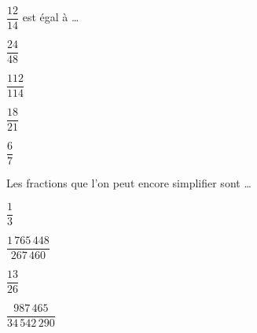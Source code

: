 \begin{QCM}
\begin{GroupeQCM}
    \begin{exercice}
      $\dfrac{12}{14}$ est égal à \ldots
      \begin{ChoixQCM}{4}
      \item $\dfrac{24}{48}$
      \item $\dfrac{112}{114}$
      \item $\dfrac{18}{21}$
      \item $\dfrac{6}{7}$
      \end{ChoixQCM}
\begin{corrige}
   \end{corrige}
    \end{exercice}
    
    
    \begin{exercice}
      Les fractions que l'on peut encore simplifier sont \ldots
      \begin{ChoixQCM}{4}
      \item $\dfrac{1}{3}$
      \item $\dfrac{1\,765\,448}{267\,460}$
      \item $\dfrac{13}{26}$
      \item $\dfrac{987\,465}{34\,542\,290}$
      \end{ChoixQCM}
\begin{corrige}
   \end{corrige}
    \end{exercice}

    \end{GroupeQCM}
\end{QCM}
 

